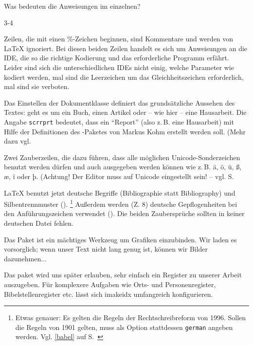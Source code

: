 Was bedeuten die Anweisungen im einzelnen?

\begin{labeling}{3-4}

 \item[1-2] Zeilen, die mit einen \%-Zeichen beginnen, sind Kommentare und
   werden von \LaTeX{} ignoriert. Bei diesen beiden Zeilen handelt es sich
   um Anweisungen an die IDE, die so die richtige Kodierung und das
   erforderliche Programm erfährt.  Leider sind sich die unterschiedlichen
   IDEs nicht einig, welche Parameter wie kodiert werden, mal sind die
   Leerzeichen um das Gleichheitszeichen erforderlich, mal sind sie
   verboten.

 \item[3] Das Einstellen der Dokumentklasse definiert das grundsätzliche
   Aussehen des Textes: geht es um ein Buch, einen Artikel oder -- wie hier
   -- eine Hausarbeit.  Die Angabe \lstinline/scrrprt/ bedeutet, dass ein
   \enquote{Report} (also z.\,B. eine Hausarbeit) mit Hilfe der Definitionen
   des \KOMAScript-Paketes von Markus Kohm erstellt werden soll.  (Mehr dazu
   vgl. \pageref{komaskript}
 
 \item[5-6] Zwei Zauberzeilen, die dazu führen, dass alle möglichen
   Unicode-Sonderzeichen benutzt werden dürfen und auch ausgegeben werden
   können wie z.\,B. ä, ö, ü, ß, æ, ï oder þ.  (Achtung! Der Editor muss auf
   Unicode eingestellt sein! -- vgl. S.~\pageref{unicode}
 
 \item[8-9] \LaTeX{} benutzt jetzt deutsche Begriffe (Bibliographie statt
   Bibliography) und Silbentrennmuster ().  \footnote{Etwas
   genauer: Es gelten die Regeln der Rechtschreibreform von 1996.
   Sollen die Regeln von 1901 gelten, muss als Option stattdessen
   \lstinline/german/ angeben werden. Vgl. \ref{babel} auf
   S.~\pageref{babel}} Außerdem werden (Z. 8) deutsche Gepflogenheiten bei
   den Anführungszeichen verwendet ().  Die beiden
   Zaubersprüche sollten in keiner deutschen Datei fehlen.
 
 \item[11] Das Paket  ist ein mächtiges Werkzeug um Grafiken
   einzubinden.  Wir laden es vorsorglich; wenn unser Text nicht lang genug
   ist, können wir Bilder dazunehmen...
 
 \item[13] Das paket  wird uns später erlauben, sehr einfach
   ein Register zu unserer Arbeit auszugeben.  Für komplexere Aufgaben wie
   Orts- und Personenregister, Bibelstellenregister etc. lässt sich imakeidx
   umfangreich konfigurieren.
 

\end{labeling}
